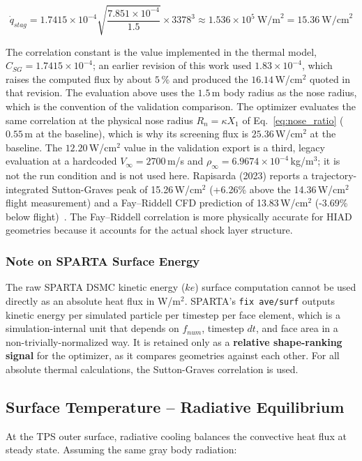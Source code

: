 \begin{equation}
    \dot{q}_{stag} = 1.7415 \times 10^{-4} \sqrt{\frac{7.851 \times 10^{-4}}{1.5}} \times 3378^3 \approx 1.536 \times 10^{5} \ \text{W/m}^2 = 15.36 \ \text{W/cm}^2
\end{equation}

The correlation constant is the value implemented in the thermal model, $C_{SG} = 1.7415 \times 10^{-4}$; an earlier revision of this work used $1.83 \times 10^{-4}$, which raises the computed flux by about $5\,\%$ and produced the $16.14$\,W/cm$^2$ quoted in that revision. The evaluation above uses the $1.5$\,m body radius as the nose radius, which is the convention of the validation comparison. The optimizer evaluates the same correlation at the physical nose radius $R_n=\kappa X_1$ of Eq.~\eqref{eq:nose_ratio} ($0.55$\,m at the baseline), which is why its screening flux is $25.36$\,W/cm$^2$ at the baseline. The $12.20$\,W/cm$^2$ value in the validation export is a third, legacy evaluation at a hardcoded $V_{\infty} = 2700$\,m/s and $\rho_{\infty} = 6.9674 \times 10^{-4}$\,kg/m$^3$; it is not the run condition and is not used here. Rapisarda (2023) reports a trajectory-integrated Sutton-Graves peak of 15.26\,W/cm$^2$ (+6.26\% above the 14.36\,W/cm$^2$ flight measurement) and a Fay--Riddell CFD prediction of 13.83\,W/cm$^2$ (-3.69\% below flight)~\cite{rapisarda2023mdao}. The Fay--Riddell correlation is more physically accurate for HIAD geometries because it accounts for the actual shock layer structure.

\subsubsection*{Note on SPARTA Surface Energy}
The raw SPARTA DSMC kinetic energy ($ke$) surface computation cannot be used directly as an absolute heat flux in W/m$^2$. SPARTA's \texttt{fix ave/surf} outputs kinetic energy per simulated particle per timestep per face element, which is a simulation-internal unit that depends on $f_{num}$, timestep $dt$, and face area in a non-trivially-normalized way. It is retained only as a \textbf{relative shape-ranking signal} for the optimizer, as it compares geometries against each other. For all absolute thermal calculations, the Sutton-Graves correlation is used.

\subsection{Surface Temperature -- Radiative Equilibrium}
At the TPS outer surface, radiative cooling balances the convective heat flux at steady state. Assuming the same gray body radiation:

